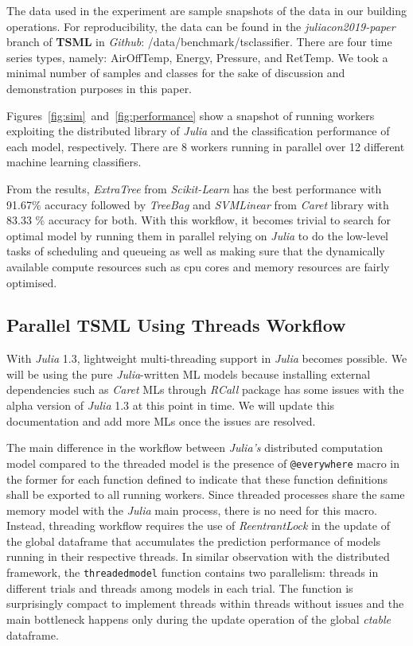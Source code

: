 \documentclass{juliacon}
\begin{document}
The data used in the experiment are sample snapshots of the data in our building operations. For reproducibility, the data can be found in the  \emph{juliacon2019-paper} branch of \textbf{TSML} in \emph{Github}:  /data/benchmark/tsclassifier. There are four time series types, namely: AirOffTemp, Energy, Pressure, and RetTemp.  We  took a minimal number of samples and classes for the sake of discussion and demonstration purposes in this paper.

\vskip 6pt

Figures~\ref{fig:sim}~and~\ref{fig:performance}  show a snapshot of running workers exploiting the distributed library of \emph{Julia} and the classification performance of each model, respectively. There are 8 workers running in parallel over 12 different machine learning classifiers. 

\vskip 6pt

From the results, \emph{ExtraTree} from \emph{Scikit-Learn} has the best performance with 91.67\% accuracy followed by \emph{TreeBag} and \emph{SVMLinear} from \emph{Caret} library with 83.33 \% accuracy for both. With this workflow, it becomes trivial to search for optimal model by running them in parallel relying on \emph{Julia} to do the low-level tasks of scheduling and queueing as well as making sure that  the dynamically available compute resources such as cpu cores and memory resources are fairly optimised.           

\subsection{Parallel TSML Using Threads Workflow}
With \emph{Julia} 1.3, lightweight multi-threading support in \emph{Julia} becomes possible. We will be using the pure \emph{Julia}-written ML models because installing external dependencies such as \emph{Caret} MLs through \emph{RCall} package has some issues with the alpha version of \emph{Julia} 1.3 at this point in time. We will update this documentation and add more MLs once the issues are resolved.

\vskip 6pt

The main difference in the workflow between \emph{Julia's} distributed computation model compared to the threaded model is the presence of \texttt{@everywhere} macro in the former for each function defined to indicate that these function definitions shall be exported to all running workers. Since threaded processes share the same memory model with the \emph{Julia} main process, there is no need for this macro. Instead, threading workflow requires the use of \emph{ReentrantLock} in the update of the global dataframe that accumulates the prediction performance of models running in their respective threads. In similar observation with the distributed framework, the \texttt{threadedmodel} function contains two parallelism: threads in different trials and threads among models in each trial. The function is surprisingly compact to implement threads within threads without issues and the main bottleneck happens only during the update operation of the global \emph{ctable} dataframe.
\end{document}
